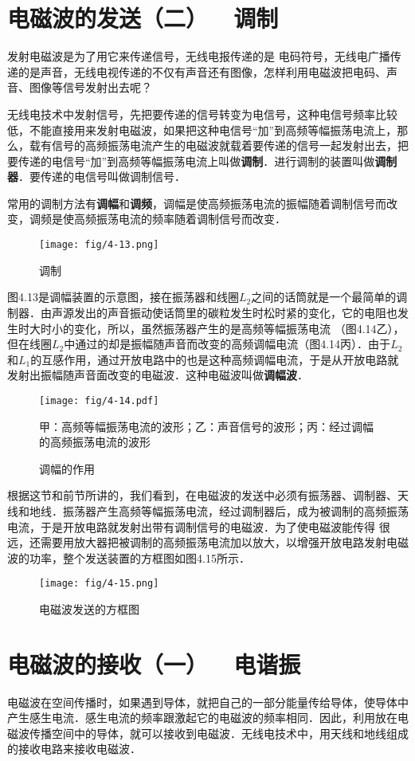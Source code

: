 \section{电磁波的发送（二）~~调制}
发射电磁波是为了用它来传递信号，无线电报传递的是
电码符号，无线电广播传递的是声音，无线电视传递的不仅有声音还有图像，怎样利用电磁波把电码、声音、图像等信号发射出去呢？

无线电技术中发射信号，先把要传递的信号转变为电信号，这种电信号频率比较低，不能直接用来发射电磁波，如果把这种电信号“加”到高频等幅振荡电流上，那么，载有信号的高频振荡电流产生的电磁波就载着要传递的信号一起发射出去，把要传递的电信号“加”到高频等幅振荡电流上叫做\textbf{调制}．进行调制的装置叫做\textbf{调制器}．要传递的电信号叫做调制信号．

常用的调制方法有\textbf{调幅}和\textbf{调频}，调幅是使高频振荡电流的振幅随着调制信号而改变，调频是使高频振荡电流的频率随着调制信号而改变．
\begin{figure}[htp]\centering
\texttt{[image: fig/4-13.png]}
\caption{调制}
\end{figure}

图4.13是调幅装置的示意图，接在振荡器和线圈$L_2$之间的话筒就是一个最简单的调制器．由声源发出的声音振动使话筒里的碳粒发生时松时紧的变化，它的电阻也发生时大时小的变化，所以，虽然振荡器产生的是高频等幅振荡电流
（图4.14乙），但在线圈$L_2$中通过的却是振幅随声音而改变的高频调幅电流（图4.14丙）．由于$L_2$和$L_1$的互感作用，通过开放电路中的也是这种高频调幅电流，于是从开放电路就发射出振幅随声音面改变的电磁波．这种电磁波叫做\textbf{调幅波}．
\begin{figure}[htp]\centering
	\texttt{[image: fig/4-14.pdf]}
	
	甲：高频等幅振荡电流的波形；乙：声音信号的波形；丙：经过调幅的高频振荡电流的波形
	\caption{调幅的作用}
	\end{figure}

根据这节和前节所讲的，我们看到，在电磁波的发送中必须有振荡器、调制器、天线和地线．振荡器产生高频等幅振荡电流，经过调制器后，成为被调制的高频振荡电流，于是开放电路就发射出带有调制信号的电磁波．为了使电磁波能传得
很远，还需要用放大器把被调制的高频振荡电流加以放大，以增强开放电路发射电磁波的功率，整个发送装置的方框图如图4.15所示．
\begin{figure}[htp]\centering
\texttt{[image: fig/4-15.png]}
\caption{电磁波发送的方框图}
\end{figure}

\section{电磁波的接收（一）~~电谐振}
电磁波在空间传播时，如果遇到导体，就把自己的一部分能量传给导体，使导体中产生感生电流．感生电流的频率跟激起它的电磁波的频率相同．因此，利用放在电磁波传播空间中的导体，就可以接收到电磁波．无线电技术中，用天线和地线组成的接收电路来接收电磁波．

